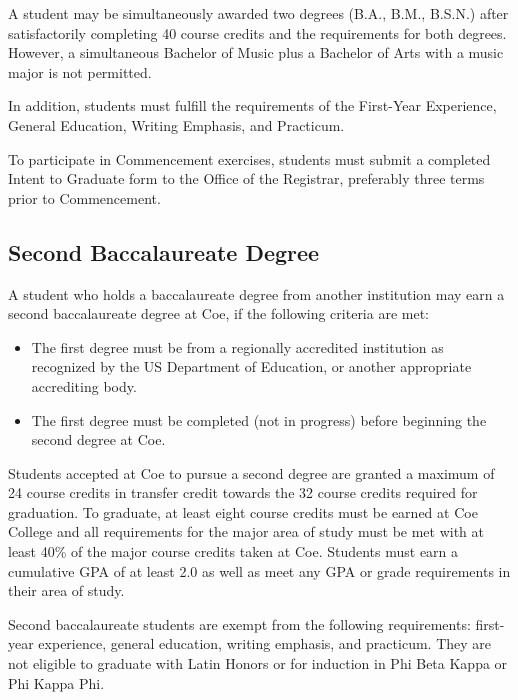 \documentclass[
  letterpaper,
]{scrbook}
\providecommand{\tightlist}{%
  \setlength{\itemsep}{0pt}\setlength{\parskip}{0pt}}
\begin{document}
A student may be simultaneously awarded two degrees (B.A., B.M., B.S.N.)
after satisfactorily completing 40 course credits and the requirements
for both degrees. However, a simultaneous Bachelor of Music plus a
Bachelor of Arts with a music major is not permitted.

In addition, students must fulfill the requirements of the First-Year
Experience, General Education, Writing Emphasis, and Practicum.

To participate in Commencement exercises, students must submit a
completed Intent to Graduate form to the Office of the Registrar,
preferably three terms prior to Commencement.

\hypertarget{second-baccalaureate-degree}{%
\subsection*{Second Baccalaureate
Degree}\label{second-baccalaureate-degree}}

A student who holds a baccalaureate degree from another institution may
earn a second baccalaureate degree at Coe, if the following criteria are
met:

\begin{itemize}
\tightlist
\item
  The first degree must be from a regionally accredited institution as
  recognized by the US Department of Education, or another appropriate
  accrediting body.
\item
  The first degree must be completed (not in progress) before beginning
  the second degree at Coe.
\end{itemize}

Students accepted at Coe to pursue a second degree are granted a maximum
of 24 course credits in transfer credit towards the 32 course credits
required for graduation. To graduate, at least eight course credits must
be earned at Coe College and all requirements for the major area of
study must be met with at least 40\% of the major course credits taken
at Coe. Students must earn a cumulative GPA of at least 2.0 as well as
meet any GPA or grade requirements in their area of study.

Second baccalaureate students are exempt from the following
requirements: first-year experience, general education, writing
emphasis, and practicum. They are not eligible to graduate with Latin
Honors or for induction in Phi Beta Kappa or Phi Kappa Phi.
\end{document}

